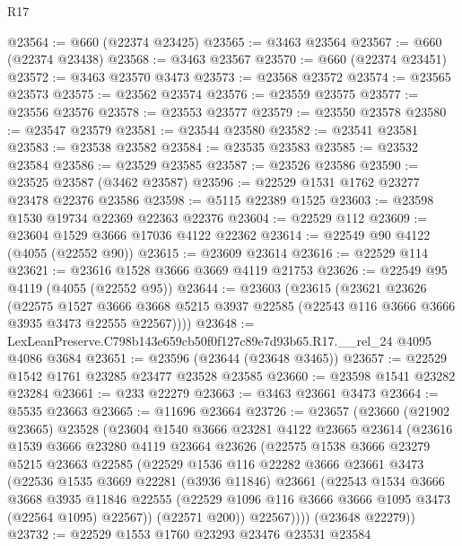 \begin{lexlean}{R17}
\begin{coremodule}
@23564 := @660 (@22374 @23425)
@23565 := @3463 @23564
@23567 := @660 (@22374 @23438)
@23568 := @3463 @23567
@23570 := @660 (@22374 @23451)
@23572 := @3463 @23570 @3473
@23573 := @23568 @23572
@23574 := @23565 @23573
@23575 := @23562 @23574
@23576 := @23559 @23575
@23577 := @23556 @23576
@23578 := @23553 @23577
@23579 := @23550 @23578
@23580 := @23547 @23579
@23581 := @23544 @23580
@23582 := @23541 @23581
@23583 := @23538 @23582
@23584 := @23535 @23583
@23585 := @23532 @23584
@23586 := @23529 @23585
@23587 := @23526 @23586
@23590 := @23525 @23587 (@3462 @23587)
@23596 := @22529 @1531 @1762 @23277 @23478 @22376 @23586
@23598 := @5115 @22389 @1525
@23603 := @23598 @1530 @19734 @22369 @22363 @22376
@23604 := @22529 @112
@23609 := @23604 @1529 @3666 @17036 @4122 @22362
@23614 := @22549 @90 @4122 (@4055 (@22552 @90))
@23615 := @23609 @23614
@23616 := @22529 @114
@23621 := @23616 @1528 @3666 @3669 @4119 @21753
@23626 := @22549 @95 @4119 (@4055 (@22552 @95))
@23644 := @23603
    (@23615
      (@23621
        @23626
        (@22575
          @1527
          @3666
          @3668
          @5215
          @3937
          @22585
          (@22543 @116 @3666 @3666 @3935 @3473 @22555 @22567))))
@23648 := LexLeanPreserve.C798b143e659cb50f0f127c89e7d93b65.R17.__rel_24 @4095 @4086 @3684
@23651 := @23596 (@23644 (@23648 @3465))
@23657 := @22529 @1542 @1761 @23285 @23477 @23528 @23585
@23660 := @23598 @1541 @23282 @23284
@23661 := @233 @22279
@23663 := @3463 @23661 @3473
@23664 := @5535 @23663
@23665 := @11696 @23664
@23726 := @23657
    (@23660
      (@21902 @23665)
      @23528
      (@23604
        @1540
        @3666
        @23281
        @4122
        @23665
        @23614
        (@23616
          @1539
          @3666
          @23280
          @4119
          @23664
          @23626
          (@22575
            @1538
            @3666
            @23279
            @5215
            @23663
            @22585
            (@22529
              @1536
              @116
              @22282
              @3666
              @23661
              @3473
              (@22536
                @1535
                @3669
                @22281
                (@3936 @11846)
                @23661
                (@22543
                  @1534
                  @3666
                  @3668
                  @3935
                  @11846
                  @22555
                  (@22529 @1096 @116 @3666 @3666 @1095 @3473 (@22564 @1095) @22567))
                (@22571 @200))
              @22567))))
      (@23648 @22279))
@23732 := @22529 @1553 @1760 @23293 @23476 @23531 @23584

\end{coremodule}
\end{lexlean}
